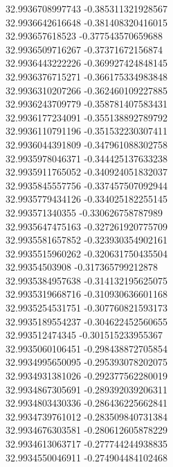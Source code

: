 {32.9936708997743	-0.385311321928567\\
32.9936642616648	-0.381408320416015\\
32.993657618523	-0.377543570659688\\
32.9936509716267	-0.37371672156874\\
32.9936443222226	-0.369927424848145\\
32.9936376715271	-0.366175334983848\\
32.9936310207266	-0.362460109227885\\
32.9936243709779	-0.358781407583431\\
32.9936177234091	-0.355138892789792\\
32.9936110791196	-0.351532230307411\\
32.9936044391809	-0.347961088302758\\
32.9935978046371	-0.344425137633238\\
32.9935911765052	-0.340924051832037\\
32.9935845557756	-0.337457507092944\\
32.9935779434126	-0.334025182255145\\
32.993571340355	-0.330626758787989\\
32.9935647475163	-0.327261920775709\\
32.9935581657852	-0.323930354902161\\
32.9935515960262	-0.320631750435504\\
32.99354503908	-0.317365799212878\\
32.9935384957638	-0.314132195625075\\
32.9935319668716	-0.310930636601168\\
32.9935254531751	-0.307760821593173\\
32.9935189554237	-0.304622452560655\\
32.993512474345	-0.301515233955367\\
32.9935060106451	-0.298438872705854\\
32.9934995650095	-0.295393078202075\\
32.9934931381026	-0.292377562280019\\
32.9934867305691	-0.289392039206311\\
32.9934803430336	-0.286436225662841\\
32.9934739761012	-0.283509840731384\\
32.9934676303581	-0.280612605878229\\
32.9934613063717	-0.277744244938835\\
32.9934550046911	-0.274904484102468\\
}

